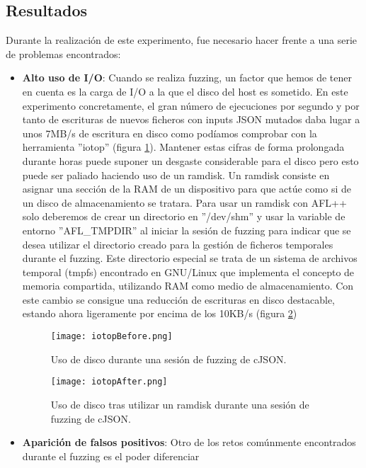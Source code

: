 \subsection{Resultados}
Durante la realización de este experimento, fue necesario hacer frente a una serie de problemas encontrados:
\begin{itemize}
    \item \textbf{Alto uso de I/O}: Cuando se realiza fuzzing, un factor que hemos de tener en cuenta es la carga 
    de I/O a la que el disco del host es sometido. En este experimento concretamente, el gran número de ejecuciones por 
    segundo y por tanto de escrituras de nuevos ficheros con inputs JSON mutados daba lugar a unos 7MB/s de escritura en 
    disco como podíamos comprobar con la herramienta ''iotop'' (figura \ref{fig:iotopBefore}). Mantener estas cifras de forma 
    prolongada durante horas puede suponer un desgaste considerable para el disco pero esto puede ser paliado haciendo uso 
    de un ramdisk. Un ramdisk consiste en asignar una sección de la RAM de un dispositivo para que actúe como si de un disco
    de almacenamiento se tratara. Para usar un ramdisk con AFL++ solo deberemos de crear un directorio en ''/dev/shm'' y usar la 
    variable de entorno ''AFL\_TMPDIR'' al iniciar la sesión de fuzzing para indicar que se desea utilizar el directorio creado para 
    la gestión de ficheros temporales durante el fuzzing. Este directorio especial se trata de un sistema de archivos temporal (tmpfs)
    encontrado en GNU/Linux que implementa el concepto de memoria compartida, utilizando RAM como medio de almacenamiento. Con este 
    cambio se consigue una reducción de escrituras en disco destacable, estando ahora ligeramente por encima de los 10KB/s 
    (figura \ref{fig:iotopAfter})
    \begin{figure}[H]
        \centering
        \texttt{[image: iotopBefore.png]}
        \caption{Uso de disco durante una sesión de fuzzing de cJSON.}
        \label{fig:iotopBefore}
    \end{figure}
    \begin{figure}[H]
        \centering
        \texttt{[image: iotopAfter.png]}
        \caption{Uso de disco tras utilizar un ramdisk durante una sesión de fuzzing de cJSON.}
        \label{fig:iotopAfter}
    \end{figure}
    \item \textbf{Aparición de falsos positivos}: Otro de los retos comúnmente encontrados durante el fuzzing es el poder diferenciar 

\end{itemize}
